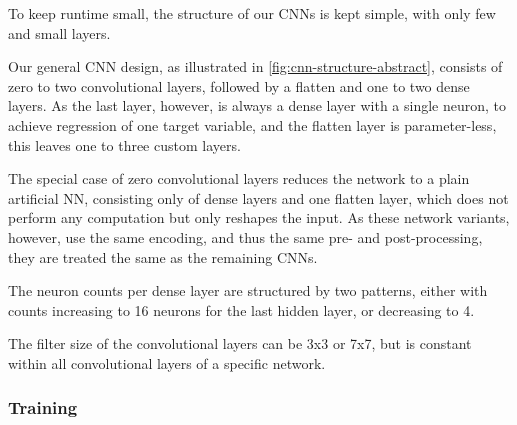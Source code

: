 To keep runtime small, the structure of our \glspl{CNN} is kept simple, with only few and small layers.

Our general \gls{CNN} design, as illustrated in \ref{fig:cnn-structure-abstract}, consists of zero to two convolutional layers, followed by a flatten and one to two dense layers. As the last layer, however, is always a dense layer with a single neuron, to achieve regression of one target variable, and the flatten layer is parameter-less, this leaves one to three custom layers. 

The special case of zero convolutional layers reduces the network to a plain artificial \gls{NN}, consisting only of dense layers and one flatten layer, which does not perform any computation but only reshapes the input. As these network variants, however, use the same encoding, and thus the same pre- and post-processing, they are treated the same as the remaining \glspl{CNN}.

The neuron counts per dense layer are structured by two patterns, either with counts increasing to 16 neurons for the last hidden layer, or decreasing to 4.

The filter size of the convolutional layers can be 3x3 or 7x7, but is constant within all convolutional layers of a specific network.

\subsubsection{Training}

